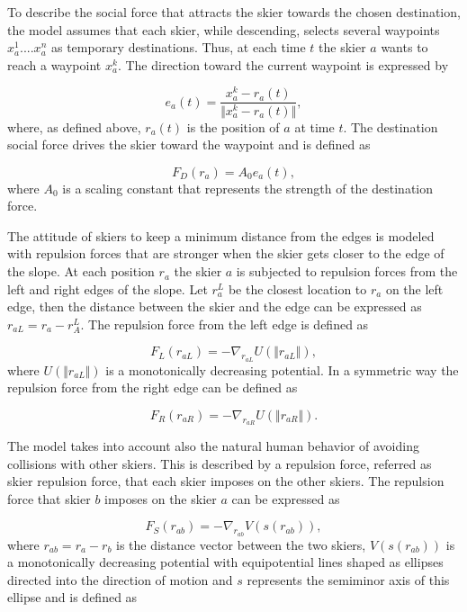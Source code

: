 \documentclass[12pt,a4paper,twoside]{book}
\begin{document}
To describe the social force that attracts the skier towards the chosen destination, the model assumes that each skier, while descending, selects several waypoints $x_a^1....x_a^n$ as temporary destinations. Thus, at each time $t$ the skier $a$ wants to reach a waypoint $x_a^k$. The direction toward the current waypoint is expressed by

\begin{equation}\label{waypoint_direction}
e_a(t)=\frac{x^k_a-r_a(t)}{\Vert x^k_a-r_a(t) \Vert},
\end{equation}
where, as defined above, $r_a(t)$ is the position of $a$ at time $t$. The destination social force drives the skier toward the waypoint and is defined as

\begin{equation}\label{destination_force}
F_D(r_a)=A_0 e_a(t),
\end{equation}
where $A_0$ is a scaling constant that represents the strength of the destination force.

The attitude of skiers to keep a minimum distance from the edges is modeled with repulsion forces that are stronger when the skier gets closer to the edge of the slope. At each position $r_a$ the skier $a$ is subjected to repulsion forces from the left and right edges of the slope. Let $r_a^L$ be the closest location to $r_a$ on the left edge, then the distance between the skier and the edge can be expressed as $r_{aL}=r_a-r_A^L$. The repulsion force from the left edge is defined as

\begin{equation}\label{left_force}
F_L(r_{aL})=-\nabla_{r_{aL}}U(\Vert r_{aL} \Vert ),
\end{equation}
where $U(\Vert r_{aL} \Vert )$ is a monotonically decreasing potential. In a symmetric way the repulsion force from the right edge can be defined as

\begin{equation}\label{right_force}
F_R(r_{aR})=-\nabla_{r_{aR}}U(\Vert r_{aR} \Vert ).
\end{equation}

The model takes into account also the natural human behavior of avoiding collisions with other skiers. This is described by a repulsion force, referred as skier repulsion force, that each skier imposes on the other skiers. The repulsion force that skier $b$ imposes on the skier $a$ can be expressed as

\begin{equation}\label{skier_force}
F_S(r_{ab})=-\nabla_{r_{ab}}V(s(r_{ab})),
\end{equation}
where $r_{ab}=r_a-r_b$ is the distance vector between the two skiers, $V(s(r_{ab}))$ is a monotonically decreasing potential with equipotential lines shaped as ellipses directed into the direction of motion and $s$ represents the semiminor axis of this ellipse and is defined as
\end{document}
